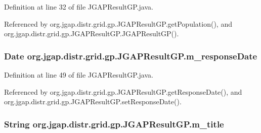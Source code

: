 Definition at line 32 of file J\-G\-A\-P\-Result\-G\-P.\-java.



Referenced by org.\-jgap.\-distr.\-grid.\-gp.\-J\-G\-A\-P\-Result\-G\-P.\-get\-Population(), and org.\-jgap.\-distr.\-grid.\-gp.\-J\-G\-A\-P\-Result\-G\-P.\-J\-G\-A\-P\-Result\-G\-P().

\hypertarget{classorg_1_1jgap_1_1distr_1_1grid_1_1gp_1_1_j_g_a_p_result_g_p_a323727b73a3aa26b8b1fd0b51269fe4c}{
\subsubsection[{m\-\_\-response\-Date}]{\setlength{\rightskip}{0pt plus 5cm}Date org.\-jgap.\-distr.\-grid.\-gp.\-J\-G\-A\-P\-Result\-G\-P.\-m\-\_\-response\-Date\hspace{0.3cm}{\ttfamily [private]}}}\label{classorg_1_1jgap_1_1distr_1_1grid_1_1gp_1_1_j_g_a_p_result_g_p_a323727b73a3aa26b8b1fd0b51269fe4c}


Definition at line 49 of file J\-G\-A\-P\-Result\-G\-P.\-java.



Referenced by org.\-jgap.\-distr.\-grid.\-gp.\-J\-G\-A\-P\-Result\-G\-P.\-get\-Response\-Date(), and org.\-jgap.\-distr.\-grid.\-gp.\-J\-G\-A\-P\-Result\-G\-P.\-set\-Response\-Date().

\hypertarget{classorg_1_1jgap_1_1distr_1_1grid_1_1gp_1_1_j_g_a_p_result_g_p_aed31a32095b711634273415dafc752f3}{
\subsubsection[{m\-\_\-title}]{\setlength{\rightskip}{0pt plus 5cm}String org.\-jgap.\-distr.\-grid.\-gp.\-J\-G\-A\-P\-Result\-G\-P.\-m\-\_\-title\hspace{0.3cm}{\ttfamily [private]}}}\label{classorg_1_1jgap_1_1distr_1_1grid_1_1gp_1_1_j_g_a_p_result_g_p_aed31a32095b711634273415dafc752f3}


